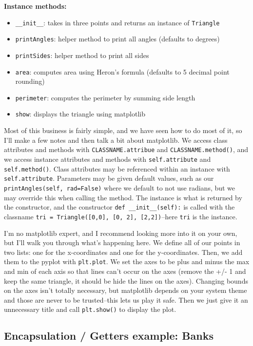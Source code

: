 \documentclass[12pt, twoside, reqno]{book}
\begin{document}
\textbf{Instance methods:}
\begin{itemize}[itemsep=2px, parsep=0pt]
\item \texttt{\_\_init\_\_}: takes in three points and returns an instance of \texttt{Triangle}
\item \texttt{printAngles}: helper method to print all angles (defaults to degrees)
\item \texttt{printSides}: helper method to print all sides
\item \texttt{area}: computes area using Heron's formula (defaults to 5 decimal point rounding)
\item \texttt{perimeter}: computes the perimeter by summing side length
\item \texttt{show}: displays the triangle using matplotlib
\end{itemize}
Most of this business is fairly simple, and we have seen how to do most of it, so I'll make a few notes and then talk a bit about matplotlib. We access class attributes and methods with \texttt{CLASSNAME.attribue} and \texttt{CLASSNAME.method()}, and we access instance attributes and methods with \texttt{self.attribute} and \texttt{self.method()}. Class attributes may be referenced within an instance with \texttt{self.attribute}. Parameters may be given default values, such as our \texttt{printAngles(self, rad=False)} where we default to not use radians, but we may override this when calling the method. The instance is what is returned by the constructor, and the constructor \texttt{def \_\_init\_\_(self):} is called with the classname \texttt{tri = Triangle([0,0], [0, 2], [2,2])}--here \texttt{tri} is the instance.

I'm no matplotlib expert, and I recommend looking more into it on your own, but I'll walk you through what's happening here. We define all of our points in two lists: one for the x-coordinates and one for the y-coordinates. Then, we add them to the pyplot with \texttt{plt.plot}. We set the axes to be plus and minus the max and min of each axis so that lines can't occur on the axes (remove the +/- 1 and keep the same triangle, it should be hide the lines on the axes). Changing bounds on the axes isn't totally necessary, but matplotlib depends on your system theme and those are never to be trusted--this lets us play it safe. Then we just give it an unnecessary title and call \texttt{plt.show()} to display the plot.

\subsection{Encapsulation / Getters example: Banks}
\end{document}
